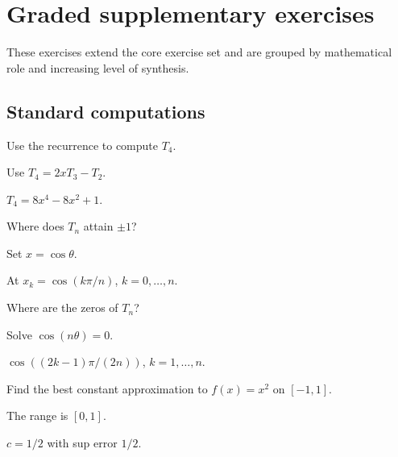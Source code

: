 \section{Graded supplementary exercises}
These exercises extend the core exercise set and are grouped by mathematical role and increasing level of synthesis.

\subsection*{Standard computations}

\begin{exercise}[Compute \(T_4\)]\label{exr:ii22-expand-01}
Use the recurrence to compute \(T_4\).
\end{exercise}
\begin{hint}
Use \(T_4=2xT_3-T_2\).
\end{hint}
\begin{solution}
\(T_4=8x^4-8x^2+1\).
\end{solution}

\begin{exercise}[Extrema]\label{exr:ii22-expand-02}
Where does \(T_n\) attain \(\pm1\)?
\end{exercise}
\begin{hint}
Set \(x=\cos\theta\).
\end{hint}
\begin{solution}
At \(x_k=\cos(k\pi/n)\), \(k=0,\dots,n\).
\end{solution}

\begin{exercise}[Zeros]\label{exr:ii22-expand-03}
Where are the zeros of \(T_n\)?
\end{exercise}
\begin{hint}
Solve \(\cos(n\theta)=0\).
\end{hint}
\begin{solution}
\(\cos((2k-1)\pi/(2n))\), \(k=1,\dots,n\).
\end{solution}

\begin{exercise}\label{exr:ii22-expand-04}
Find the best constant approximation to \(f(x)=x^2\) on \([-1,1]\).
\end{exercise}
\begin{hint}
The range is \([0,1]\).
\end{hint}
\begin{solution}
\(c=1/2\) with sup error \(1/2\).
\end{solution}


